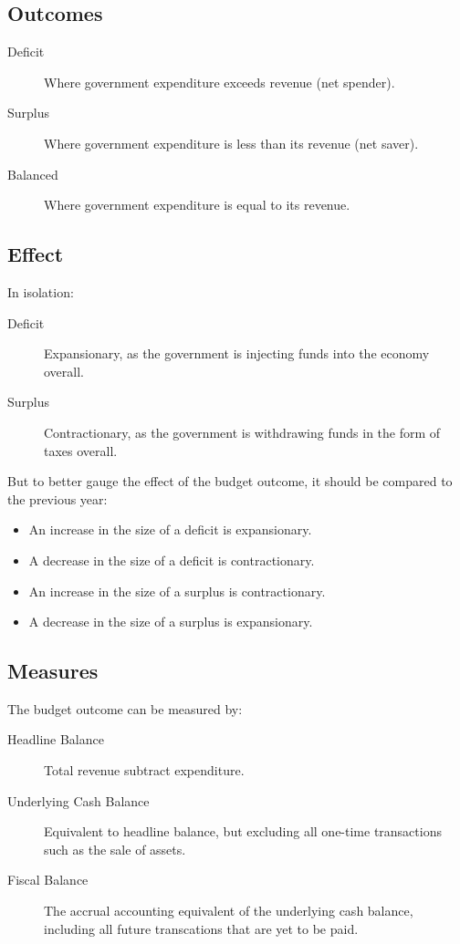 \documentclass[a4paper,11pt]{article}
\begin{document}
\subsection{Outcomes}

\begin{description}
\item [Deficit] Where government expenditure exceeds revenue (net spender).
\item [Surplus] Where government expenditure is less than its revenue (net
	saver).
\item [Balanced] Where government expenditure is equal to its revenue.
\end{description}

\subsection{Effect}

In isolation:

\begin{description}
\item [Deficit] Expansionary, as the government is injecting funds into the
	economy overall.
\item [Surplus] Contractionary, as the government is withdrawing funds in the
	form of taxes overall.
\end{description}

But to better gauge the effect of the budget outcome, it should be compared to
the previous year:

\begin{itemize}
\item An increase in the size of a deficit is expansionary.
\item A decrease in the size of a deficit is contractionary.
\item An increase in the size of a surplus is contractionary.
\item A decrease in the size of a surplus is expansionary.
\end{itemize}


\subsection{Measures}

The budget outcome can be measured by:

\begin{description}
\item [Headline Balance] Total revenue subtract expenditure.
\item [Underlying Cash Balance] Equivalent to headline balance, but excluding
	all one-time transactions such as the sale of assets.
\item [Fiscal Balance] The accrual accounting equivalent of the underlying cash
	balance, including all future transcations that are yet to be paid.
\end{description}
\end{document}

